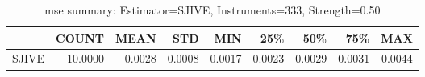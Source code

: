 \begin{table}[ht]
\centering
\caption{mse summary: Estimator=SJIVE, Instruments=333, Strength=0.50}
\begin{tabular}{lrrrrrrrr}
\toprule
 & COUNT & MEAN & STD & MIN & 25\% & 50\% & 75\% & MAX \\
\midrule
SJIVE & 10.0000 & 0.0028 & 0.0008 & 0.0017 & 0.0023 & 0.0029 & 0.0031 & 0.0044 \\
\bottomrule
\end{tabular}
\end{table}
